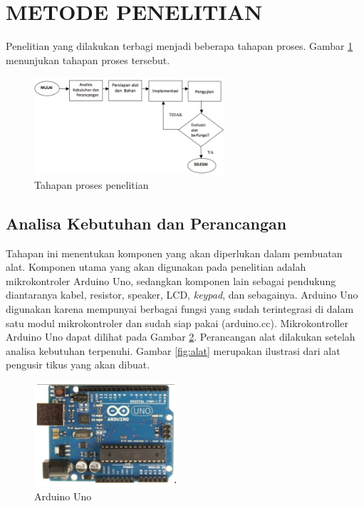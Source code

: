 \section*{METODE PENELITIAN}

Penelitian yang dilakukan terbagi menjadi beberapa tahapan proses. Gambar \ref{fig:tahapan} menunjukan tahapan proses tersebut.

\begin{figure}[h!] %
\centering
\includegraphics[width=200pt]{kolokium_contoh_gb1.png}
\caption{Tahapan proses penelitian}
\label{fig:tahapan}
\end{figure}

\subsection*{Analisa Kebutuhan dan Perancangan}

Tahapan ini menentukan komponen yang akan diperlukan dalam pembuatan alat. Komponen utama yang akan digunakan pada penelitian adalah mikrokontroler Arduino Uno, sedangkan komponen lain sebagai pendukung diantaranya kabel, resistor, speaker, LCD, \textit{keypad}, dan sebagainya. Arduino Uno digunakan karena mempunyai berbagai fungsi yang sudah terintegrasi di dalam satu modul mikrokontroler dan sudah siap pakai (arduino.cc). Mikrokontroller Arduino Uno dapat dilihat pada Gambar \ref{fig:uno}. Perancangan alat dilakukan setelah analisa kebutuhan terpenuhi. Gambar \ref{fig:alat} merupakan ilustrasi dari alat pengusir tikus yang akan dibuat.

\begin{figure}[h!]\centering %
\includegraphics[width=150pt]{kolokium_contoh_gb2.png}
\caption{Arduino Uno}
\label{fig:uno}
\end{figure}


